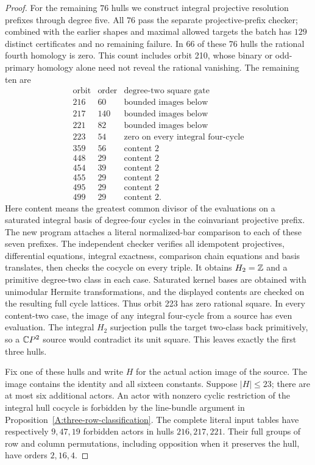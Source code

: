 \begin{proof}
For the remaining $76$ hulls we construct integral
projective resolution prefixes through degree five. All
$76$ pass the separate projective-prefix checker; combined
with the earlier shapes and maximal allowed targets the
batch has $129$ distinct certificates and no remaining
failure. In $66$ of these $76$ hulls the rational fourth
homology is zero. This count includes orbit 210, whose
binary or odd-primary homology alone need not reveal the
rational vanishing. The remaining ten are
\[
\begin{array}{c|r|l}
 \text{orbit}&\text{order}&\text{degree-two square gate}\\\hline
216&60&\text{bounded images below}\\
217&140&\text{bounded images below}\\
221&82&\text{bounded images below}\\
223&54&\text{zero on every integral four-cycle}\\
359&56&\text{content }2\\
448&29&\text{content }2\\
454&39&\text{content }2\\
455&29&\text{content }2\\
495&29&\text{content }2\\
499&29&\text{content }2.
\end{array}
\]
Here content means the greatest common divisor of the
evaluations on a saturated integral basis of degree-four
cycles in the coinvariant projective prefix. The new
program 
attaches a literal normalized-bar comparison to each of
these seven prefixes. The independent checker verifies
all idempotent projectives, differential equations,
integral exactness, comparison chain equations and basis
translates, then checks the cocycle on every triple.
It obtains $H_2=\mathbb{Z}$ and a primitive degree-two class
in each case. Saturated kernel bases are obtained with
unimodular Hermite transformations, and the displayed
contents are checked on the resulting full cycle lattices.
Thus orbit 223 has zero rational square. In every
content-two case, the image of any integral four-cycle
from a source has even evaluation. The integral
$H_2$ surjection pulls the target two-class back
primitively, so a $\mathbb{C}P^2$ source would contradict its
unit square. This leaves exactly the first three hulls.

Fix one of these hulls and write $H$ for the actual
action image of the source. The image contains the
identity and all sixteen constants. Suppose $|H|\leq23$;
there are at most six additional actors.
An actor with nonzero cyclic restriction of the integral
hull cocycle is forbidden by the line-bundle argument
in Proposition~\ref{A:three-row-classification}.
The complete literal input tables have respectively
$9,47,19$ forbidden actors in hulls $216,217,221$.
Their full groups of row and column permutations,
including opposition when it preserves the hull,
have orders $2,16,4$.


\end{proof}
